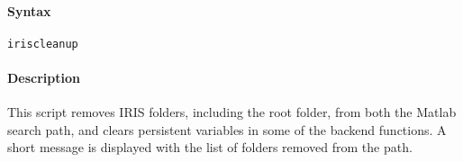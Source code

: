 


	\paragraph{Syntax}

\begin{verbatim}
iriscleanup
\end{verbatim}

\paragraph{Description}

This script removes IRIS folders, including the root folder, from both
the Matlab search path, and clears persistent variables in some of the
backend functions. A short message is displayed with the list of folders
removed from the path.


